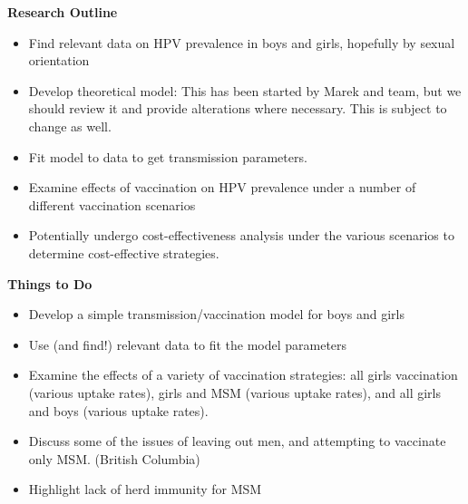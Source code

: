 \documentclass[12pt]{article}
\begin{document}
{\bfseries{Research Outline}}
\begin{itemize}
\item Find relevant data on HPV prevalence in boys and girls, hopefully by sexual orientation
\item Develop theoretical model:  This has been started by Marek and team, but we should review it and provide alterations where necessary.  This is subject to change as well.
\item Fit model to data to get transmission parameters.
\item Examine effects of vaccination on HPV prevalence under a number of different vaccination scenarios
\item Potentially undergo cost-effectiveness analysis under the various scenarios to determine cost-effective strategies.
\end{itemize}



{\bfseries{Things to Do}}
\begin{itemize}
\item Develop a simple transmission/vaccination model for boys and girls
\item Use (and find!) relevant data to fit the model parameters
\item Examine the effects of a variety of vaccination strategies: all girls vaccination (various uptake rates), girls and MSM (various uptake rates), and all girls and boys (various uptake rates).
\item Discuss some of the issues of leaving out men, and attempting to vaccinate only MSM. (British Columbia)
\item Highlight lack of herd immunity for MSM

\end{itemize}

\newpage


\end{document}
